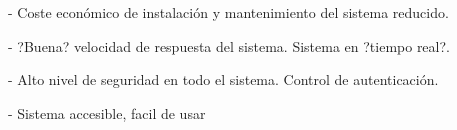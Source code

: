 - Coste económico de instalación y mantenimiento del sistema reducido.\newline

- ?Buena? velocidad de respuesta del sistema. Sistema en ?tiempo real?.\newline

- Alto nivel de seguridad en todo el sistema. Control de autenticación.\newline

- Sistema accesible, facil de usar\newline











